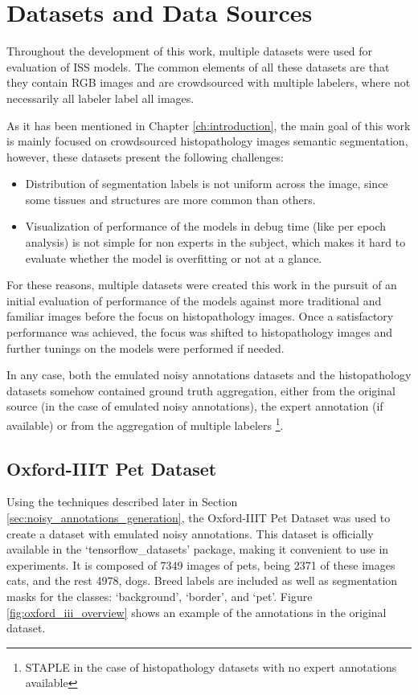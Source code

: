 \section{Datasets and Data Sources}

Throughout the development of this work, multiple datasets were used
for evaluation of \gls{ISS} models. The common elements of all these datasets
are that they contain RGB images and are crowdsourced with multiple
labelers, where not necessarily all labeler label all images.

As it has been mentioned in Chapter \ref{ch:introduction}, the main goal of this
work is mainly focused on crowdsourced histopathology images semantic
segmentation, however, these datasets present the following challenges:

\begin{itemize}
  \item Distribution of segmentation labels is not uniform across the
    image, since some tissues and structures are more common than others.
  \item Visualization of performance of the models in debug time (like per epoch
    analysis) is not simple for non experts in the subject, which makes it
    hard to evaluate whether the model is overfitting or not at a glance.
\end{itemize}

For these reasons, multiple datasets were created this work in the pursuit of
an initial evaluation of performance of the models against more traditional
and familiar images before the focus on histopathology images. Once a
satisfactory performance was achieved, the focus was shifted to
histopathology images and further tunings on the models
were performed if needed.

In any case, both the emulated noisy annotations datasets and the
histopathology datasets somehow contained ground truth aggregation, either from
the original source (in the case of emulated noisy annotations), the
expert annotation (if available) or from the aggregation of multiple
labelers \footnote{\gls{STAPLE} in the case of histopathology
datasets with no expert annotations available}.

\subsection{Oxford-IIIT Pet Dataset}

Using the techniques described later in Section
\ref{sec:noisy_annotations_generation},
the Oxford-IIIT Pet Dataset \cite{ParkhiEtAl2012} was used to create a dataset
with emulated noisy annotations. This dataset is officially available
in the `tensorflow\_datasets' package, making it convenient to use in
experiments. It is composed of 7349 images of pets, being 2371 of
these images cats, and the rest 4978, dogs. Breed labels are included as well as
segmentation masks for the classes: `background', `border', and `pet'.
Figure \ref{fig:oxford_iii_overview} shows an example of the annotations in
the original dataset.

